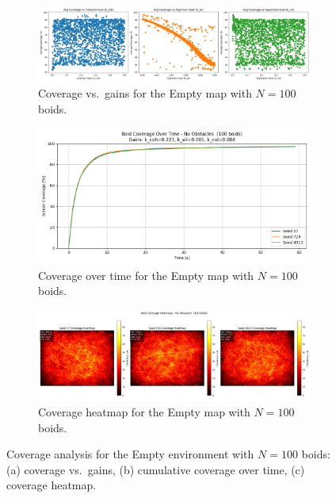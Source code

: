 \documentclass[12pt]{article}
\begin{document}
\begin{figure}[h!]
  \centering
  \begin{subfigure}[b]{0.32\linewidth}
    \includegraphics[width=\linewidth]{cov_vs_gains/empty_100.png}
    \caption{Coverage vs.~gains for the Empty map with $N=100$ boids.}
    \label{fig:app:empty100_gains}
  \end{subfigure}\hfill
  \begin{subfigure}[b]{0.32\linewidth}
    \includegraphics[width=\linewidth]{optimal_cov_vs_time/empty_100.png}
    \caption{Coverage over time for the Empty map with $N=100$ boids.}
    \label{fig:app:empty100_time}
  \end{subfigure}\hfill
  \begin{subfigure}[b]{0.32\linewidth}
    \includegraphics[width=\linewidth]{heatmaps/empty_100.png}
    \caption{Coverage heatmap for the Empty map with $N=100$ boids.}
    \label{fig:app:empty100_heat}
  \end{subfigure}
  \caption{Coverage analysis for the Empty environment with $N=100$ boids: (a) coverage vs.~gains, (b) cumulative coverage over time, (c) coverage heatmap.}
  \label{fig:app:empty100}
\end{figure}
\end{document}
